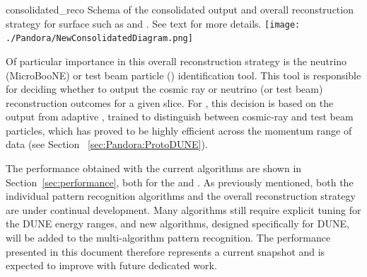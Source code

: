 \begin{dunefigure}
{consolidated_reco}
{Schema of the  consolidated output and overall reconstruction strategy for surface  such as  and . See text for more details.}
\texttt{[image: ./Pandora/NewConsolidatedDiagram.png]}
\end{dunefigure}



Of particular importance in this overall reconstruction strategy is the neutrino (MicroBooNE) or test beam particle () identification tool. This tool is responsible for deciding whether to output the cosmic ray or neutrino (or test beam) reconstruction outcomes for a given slice. For , this decision is based on the output from adaptive , trained to distinguish between cosmic-ray and test beam particles, which has proved to be highly efficient across the momentum range of  data (see Section ~\ref{sec:Pandora:ProtoDUNE}). %


The performance obtained with the current algorithms are shown in Section~\ref{sec:performance}, both for the  and .  As previously mentioned, both the individual pattern recognition algorithms and the overall reconstruction strategy are under continual development. Many algorithms %
still require explicit tuning for the DUNE energy ranges, and new algorithms, designed specifically for DUNE, will be added to the multi-algorithm pattern recognition. The performance presented in this document therefore represents a current snapshot and is expected to improve with future dedicated work. 


